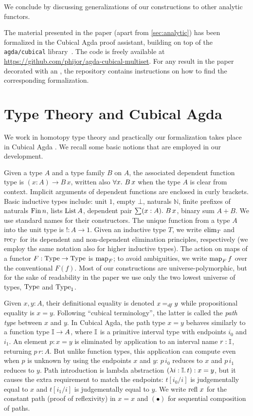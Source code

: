 \documentclass[final,a4paper,USenglish,cleveref]{lipics-v2021}
\begin{document}
We conclude by discussing generalizations of our constructions to other analytic functors.

The material presented in the paper (apart from \cref{sec:analytic}) has been formalized in the Cubical Agda proof assistant,
building on top of the {\texttt{agda/cubical}} library~\cite{AgdaCubical2018}.
The code is freely available at \url{https://github.com/phijor/agda-cubical-multiset}.
For any result in the paper decorated with an ,
the repository contains instructions on how to find the corresponding formalization.

\section{Type Theory and Cubical Agda}

We work in homotopy type theory \cite{HoTTBook} and practically our formalization takes place in Cubical Agda \cite{Vezzosi2019}. We recall some basic notions that are employed in our development.

Given a type $A$ and a type family $B$ on $A$, the associated dependent function type is $(x : A) \to B \, x$, written also $\forall x \mathpunct{.}\, B\,x$ when the type $A$ is clear from context. Implicit arguments of dependent functions are enclosed in curly brackets. Basic inductive types include: unit $1$, empty $\bot$, naturals $ℕ$, finite prefixes of naturals $\Fin n$, lists $\List A$, dependent pair $\sum (x : A) \mathpunct{.}\, B \, x$, binary sum $A + B$. We use standard names for their constructors. The unique function from a type $A$ into the unit type is $! : A \to 1$.
Given an inductive type $T$, we write $\Elim{T}$ and $\Rec{T}$ for its dependent and non-dependent elimination  principles, respectively (we employ the same notation also for higher inductive types).
The action on maps of a functor $F : \Type \to \Type$ is $\Map{F}$;
to avoid ambiguities, we write $\Map{F} f$ over the conventional $F(f)$.
Most of our constructions are universe-polymorphic, but for the sake of readability in the paper we use only the two lowest universe of types, $\Type$ and $\Type_1$.

Given $x, y : A$, their definitional equality is denoted $x \DefEq y$ while propositional equality is $x = y$.
Following ``cubical terminology'', the latter is called the \emph{path type} between $x$ and $y$.
In Cubical Agda, the path type $x = y$ behaves similarly to a function type $\mathbb{I} \to A$, where $\mathbb{I}$ is a primitive interval type with endpoints $i_0$ and $i_1$.
An element $p : x = y$ is eliminated by application to an interval name $r : \mathbb{I}$, returning $p \, r : A$.
But unlike function types, this application can compute even when $p$ is unknown by using the endpoints $x$ and $y$: $p \,i_0$ reduces to $x$ and $p \,i_1$ reduces to $y$.
Path introduction is lambda abstraction $(\lambda i : \mathbb{I}.\,t) : x = y$, but it causes the extra requirement to match the endpoints: $t[i_0 / i]$ is judgementally equal to $x$ and $t[i_1 / i]$ is judgementally equal to  $y$. We write $\Refl\,x$ for the constant path (\ie proof of reflexivity) in $x = x$ and $(\bullet)$ for sequential composition of paths.
\end{document}
